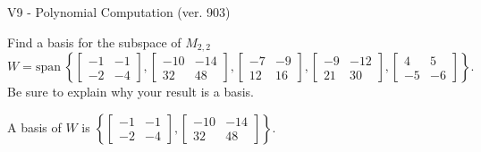 \begin{exercise}
  \begin{exerciseTitle}V9 - Polynomial Computation (ver. 903)\end{exerciseTitle}
  \begin{exerciseStatement}
    Find a basis for the subspace of \(M_{2,2}\) 
\[W=\mathrm{span}\ \left\{\left[\begin{array}{cc}
-1 & -1 \\
-2 & -4
\end{array}\right] , \left[\begin{array}{cc}
-10 & -14 \\
32 & 48
\end{array}\right] , \left[\begin{array}{cc}
-7 & -9 \\
12 & 16
\end{array}\right] , \left[\begin{array}{cc}
-9 & -12 \\
21 & 30
\end{array}\right] , \left[\begin{array}{cc}
4 & 5 \\
-5 & -6
\end{array}\right]\right\}.\]
 Be sure to explain why your result is a basis.


  \end{exerciseStatement}
  \begin{exerciseAnswer}
   A basis of \(W\) is  \(\left\{\left[\begin{array}{cc}
-1 & -1 \\
-2 & -4
\end{array}\right] , \left[\begin{array}{cc}
-10 & -14 \\
32 & 48
\end{array}\right]\right\}\).
  


  \end{exerciseAnswer}
\end{exercise}